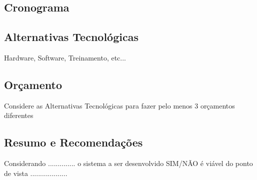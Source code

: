        \subsection{Cronograma }

       \subsection{Alternativas Tecnol\'{o}gicas }
        Hardware, Software, Treinamento, etc...

       \subsection{Or\c{c}amento }
       Considere as Alternativas Tecnol\'{o}gicas para fazer pelo menos 3 or\c{c}amentos diferentes



       \subsection{Resumo e Recomenda\c{c}\~{o}es}

       Considerando .............. o sistema a ser desenvolvido SIM/N\~{A}O \'{e} vi\'{a}vel do ponto de vista ...................
